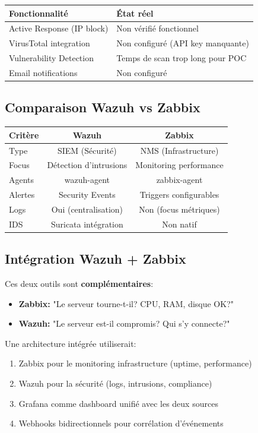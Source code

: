 \documentclass[12pt,a4paper]{article}
\begin{document}
\begin{center}
\begin{tabular}{|l|l|}
\hline
\textbf{Fonctionnalité} & \textbf{État réel} \\
\hline
Active Response (IP block) & Non vérifié fonctionnel \\
VirusTotal integration & Non configuré (API key manquante) \\
Vulnerability Detection & Temps de scan trop long pour POC \\
Email notifications & Non configuré \\
\hline
\end{tabular}
\end{center}

\subsection{Comparaison Wazuh vs Zabbix}

\begin{center}
\begin{tabular}{|l|c|c|}
\hline
\textbf{Critère} & \textbf{Wazuh} & \textbf{Zabbix} \\
\hline
Type & SIEM (Sécurité) & NMS (Infrastructure) \\
Focus & Détection d'intrusions & Monitoring performance \\
Agents & wazuh-agent & zabbix-agent \\
Alertes & Security Events & Triggers configurables \\
Logs & Oui (centralisation) & Non (focus métriques) \\
IDS & Suricata intégration & Non natif \\
\hline
\end{tabular}
\end{center}

\subsection{Intégration Wazuh + Zabbix}

Ces deux outils sont \textbf{complémentaires}:
\begin{itemize}
    \item \textbf{Zabbix:} "Le serveur tourne-t-il? CPU, RAM, disque OK?"
    \item \textbf{Wazuh:} "Le serveur est-il compromis? Qui s'y connecte?"
\end{itemize}

Une architecture intégrée utiliserait:
\begin{enumerate}
    \item Zabbix pour le monitoring infrastructure (uptime, performance)
    \item Wazuh pour la sécurité (logs, intrusions, compliance)
    \item Grafana comme dashboard unifié avec les deux sources
    \item Webhooks bidirectionnels pour corrélation d'événements
\end{enumerate}
\end{document}
